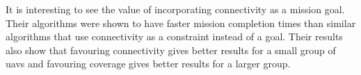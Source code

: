 It is interesting to see the value of incorporating connectivity as a mission goal. Their algorithms were shown to have faster mission completion times than similar algorithms that use connectivity as a constraint instead of a goal. Their results also show that favouring connectivity gives better results for a small group of \acp{uav} and favouring coverage gives better results for a larger group.

